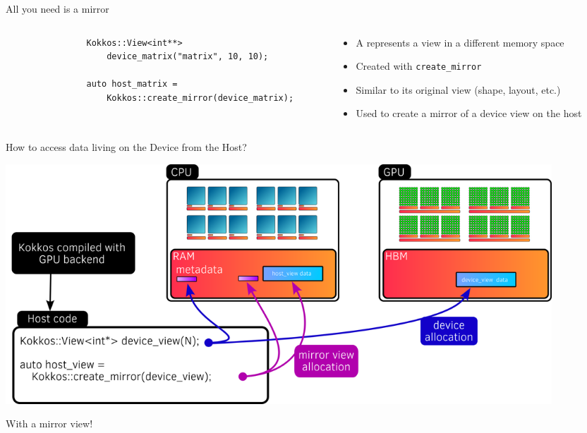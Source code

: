 \documentclass[
    aspectratio=169,
]{beamer}
\begin{document}

\begin{frame}[fragile]{All you need is a mirror}
    \begin{columns}
        \begin{column}{0.6\linewidth}
            \begin{verbatim}
                Kokkos::View<int**>
                    device_matrix("matrix", 10, 10);

                auto host_matrix =
                    Kokkos::create_mirror(device_matrix);
            \end{verbatim}

        \end{column}
        \begin{column}{0.4\linewidth}
            \begin{itemize}
                \item A  represents a view in a different memory space
                \item Created with \texttt{create\_mirror}
                \item Similar to its original view (shape, layout, etc.)
                \item Used to create a mirror of a device view on the host
            \end{itemize}
        \end{column}
    \end{columns}
\end{frame}


\begin{frame}{How to access data living on the Device from the Host?}
    \begin{center}
        \includegraphics[width=0.9\textwidth]{device_mirror_view.png}
    \end{center}

     With a mirror view!
\end{frame}
\end{document}
